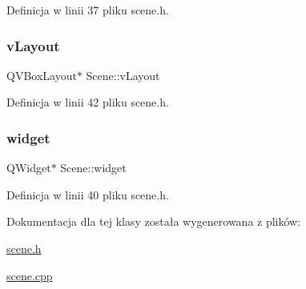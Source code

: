 Definicja w linii 37 pliku scene.\+h.

\mbox{\label{class_scene_adae30f81725ed3f2258bee8fe5e90c5d}} 
\subsubsection{\texorpdfstring{v\+Layout}{vLayout}}
{\footnotesize\ttfamily Q\+V\+Box\+Layout$\ast$ Scene\+::v\+Layout\hspace{0.3cm}{\ttfamily [private]}}



Definicja w linii 42 pliku scene.\+h.

\mbox{\label{class_scene_aa6f9d0915a83b6d5e5083c439627ff06}} 
\subsubsection{\texorpdfstring{widget}{widget}}
{\footnotesize\ttfamily Q\+Widget$\ast$ Scene\+::widget\hspace{0.3cm}{\ttfamily [private]}}



Definicja w linii 40 pliku scene.\+h.



Dokumentacja dla tej klasy została wygenerowana z plików\+:\begin{DoxyCompactItemize}
\item 
\hyperlink{scene_8h}{scene.\+h}\item 
\hyperlink{scene_8cpp}{scene.\+cpp}\end{DoxyCompactItemize}
